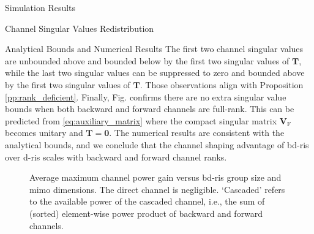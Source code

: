 \begin{section}{Simulation Results}
\begin{subsection}{Channel Singular Values Redistribution}
\begin{subsubsection}{Analytical Bounds and Numerical Results}
		 The first two channel singular values are unbounded above and bounded below by the first two singular values of $\mathbf{T}$, while the last two singular values can be suppressed to zero and bounded above by the first two singular values of $\mathbf{T}$.
		 Those observations align with Proposition \ref{pp:rank_deficient}.
		 Finally, Fig.  confirms there are no extra singular value bounds when both backward and forward channels are full-rank.
		 This can be predicted from \eqref{eq:auxiliary_matrix} where the compact singular matrix $\mathbf{V}_\mathrm{F}$ becomes unitary and $\mathbf{T}=\mathbf{0}$.
		 The numerical results are consistent with the analytical bounds, and we conclude that the channel shaping advantage of \gls{bd}-\gls{ris} over \gls{d}-\gls{ris} scales with backward and forward channel ranks.


		 \begin{figure}[!t]
			 \centering
			 \caption{
				 Average maximum channel power gain versus \gls{bd}-\gls{ris} group size and \gls{mimo} dimensions.
				 The direct channel is negligible.
				 `Cascaded' refers to the available power of the cascaded channel, i.e., the sum of (sorted) element-wise power product of backward and forward channels.
			 }
			 \label{fg:power_bond}
		 \end{figure}


\end{subsubsection}
\end{subsection}
\end{section}
